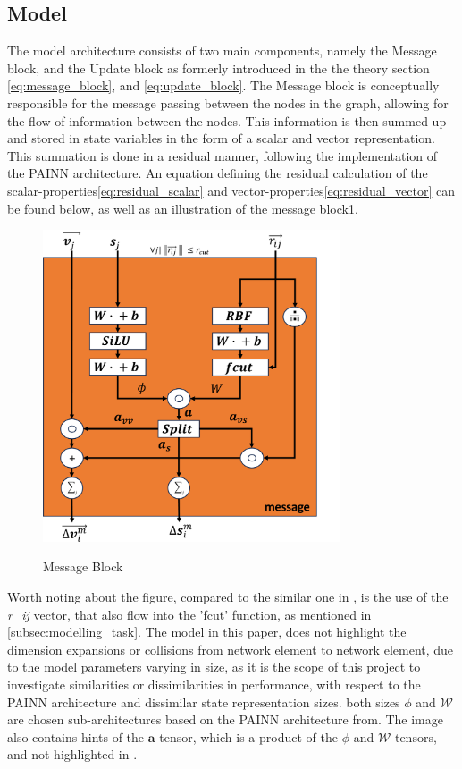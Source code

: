 \subsection{Model}\label{subsec:model}

The model architecture consists of two main components, namely the Message block, and the Update block as formerly introduced in the
the theory section \ref{eq:message_block}, and \ref{eq:update_block}.  The Message block is conceptually responsible
for the message passing between the nodes in the graph, allowing for the flow of information between the nodes.
This information is then summed up and stored in state variables in the form of a scalar and vector representation.
This summation is done in a residual manner, following the implementation of the PAINN architecture\cite{PAINN}. An equation
defining the residual calculation of the scalar-properties\ref{eq:residual_scalar} and vector-properties\ref{eq:residual_vector}
can be found below, as well as an illustration of the message block\ref{img:message_block}.

\begin{figure}[H]
    \caption{Message Block}
    \centering\label{img:message_block}
    \includegraphics[width=250pt]{Images/Method/message_block.png}
\end{figure}

Worth noting about the figure, compared to the similar one in \cite{PAINN}, is the use of the \textit{r\_ij} vector, that also flow into
the 'fcut' function, as mentioned in \ref{subsec:modelling_task}. The model in this paper, does not highlight the dimension expansions
or collisions from network element to network element, due to the model parameters varying in size, as it is the scope of this project
to investigate similarities or dissimilarities in performance, with respect to the PAINN architecture and dissimilar state representation
sizes. both sizes $\phi$ and $\mathcal{W}$ are chosen sub-architectures based on the PAINN architecture from\cite{PAINN}. The image
also contains hints of the $\mathbf{a}$-tensor, which is a product of the $\phi$ and $\mathcal{W}$ tensors, and not highlighted in \cite{PAINN}.

